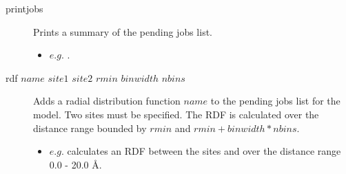 \begin{description}
	\item[printjobs\its] Prints a summary of the pending jobs list.
	\begin{itemize}
		\item $e.g.$ .
	\end{itemize}

	\item[rdf $name$ $site1$ $site2$ $rmin$ $binwidth$ $nbins$\its] Adds a radial distribution function $name$ to the pending jobs list for the model. Two sites must be specified. The RDF is calculated over the distance range bounded by $rmin$ and $rmin + binwidth*nbins$.
	\begin{itemize}
		\item $e.g.$  calculates an RDF between the sites  and  over the distance range 0.0 - 20.0 \AA{}.
	\end{itemize}

\end{description}

